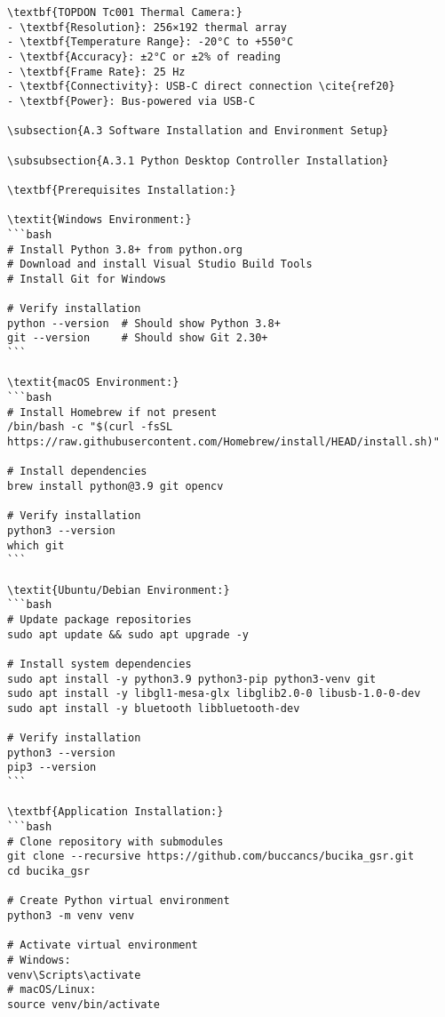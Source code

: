 \begin{verbatim}
\textbf{TOPDON Tc001 Thermal Camera:}
- \textbf{Resolution}: 256×192 thermal array
- \textbf{Temperature Range}: -20°C to +550°C
- \textbf{Accuracy}: ±2°C or ±2% of reading
- \textbf{Frame Rate}: 25 Hz
- \textbf{Connectivity}: USB-C direct connection \cite{ref20}
- \textbf{Power}: Bus-powered via USB-C

\subsection{A.3 Software Installation and Environment Setup}

\subsubsection{A.3.1 Python Desktop Controller Installation}

\textbf{Prerequisites Installation:}

\textit{Windows Environment:}
```bash
# Install Python 3.8+ from python.org
# Download and install Visual Studio Build Tools
# Install Git for Windows

# Verify installation
python --version  # Should show Python 3.8+
git --version     # Should show Git 2.30+
```

\textit{macOS Environment:}
```bash
# Install Homebrew if not present
/bin/bash -c "$(curl -fsSL https://raw.githubusercontent.com/Homebrew/install/HEAD/install.sh)"

# Install dependencies
brew install python@3.9 git opencv

# Verify installation
python3 --version
which git
```

\textit{Ubuntu/Debian Environment:}
```bash
# Update package repositories
sudo apt update && sudo apt upgrade -y

# Install system dependencies
sudo apt install -y python3.9 python3-pip python3-venv git
sudo apt install -y libgl1-mesa-glx libglib2.0-0 libusb-1.0-0-dev
sudo apt install -y bluetooth libbluetooth-dev

# Verify installation
python3 --version
pip3 --version
```

\textbf{Application Installation:}
```bash
# Clone repository with submodules
git clone --recursive https://github.com/buccancs/bucika_gsr.git
cd bucika_gsr

# Create Python virtual environment
python3 -m venv venv

# Activate virtual environment
# Windows:
venv\Scripts\activate
# macOS/Linux:
source venv/bin/activate


\end{verbatim}

